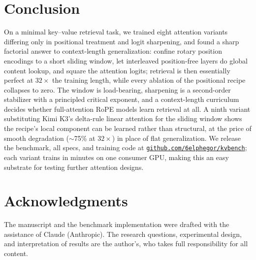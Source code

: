 \documentclass[10pt]{article}
\begin{document}
\section{Conclusion}

On a minimal key--value retrieval task, we trained eight attention
variants differing only in positional treatment and logit sharpening,
and found a sharp factorial answer to context-length generalization:
confine rotary position encodings to a short sliding window, let
interleaved position-free layers do global content lookup, and square the attention logits; retrieval is then essentially perfect at $32\times$
the training length, while every ablation of the positional recipe
collapses to zero. The window is load-bearing, sharpening is a
second-order stabilizer with a principled critical exponent, and a
context-length curriculum decides whether full-attention RoPE models
learn retrieval at all. A ninth variant substituting Kimi K3's delta-rule
linear attention for the sliding window shows the recipe's local
component can be learned rather than structural, at the price of smooth
degradation ($\sim$75\% at $32\times$) in place of flat generalization. We release the benchmark, all specs, and training
code at \href{https://github.com/6elphegor/kvbench}{\texttt{github.com/6elphegor/kvbench}};
each variant trains in minutes on one consumer GPU, making this an easy
substrate for testing further attention designs.

\section*{Acknowledgments}

The manuscript and the benchmark implementation were drafted with the
assistance of Claude (Anthropic). The research questions, experimental
design, and interpretation of results are the author's, who takes full
responsibility for all content.



\end{document}
